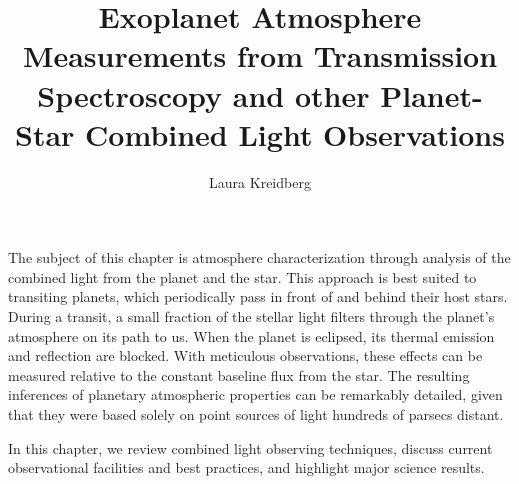 \documentclass[graybox,natbib,nosecnum]{svmult}
\begin{document}
\title*{Exoplanet Atmosphere Measurements from Transmission Spectroscopy and other Planet-Star Combined Light Observations}
\author{Laura Kreidberg}
%
%
\maketitle




The subject of this chapter is atmosphere characterization through analysis of the combined light from the planet and the star. This approach is best suited to transiting planets, which periodically pass in front of and behind their host stars. During a transit, a small fraction of the stellar light filters through the planet's atmosphere on its path to us. When the planet is eclipsed, its thermal emission and reflection are blocked.  With meticulous observations, these effects can be measured relative to the constant baseline flux from the star. The resulting inferences of planetary atmospheric properties can be remarkably detailed, given that they were based solely on point sources of light hundreds of parsecs distant.

In this chapter, we review combined light observing techniques, discuss current observational facilities and best practices, and highlight major science results.
\end{document}
